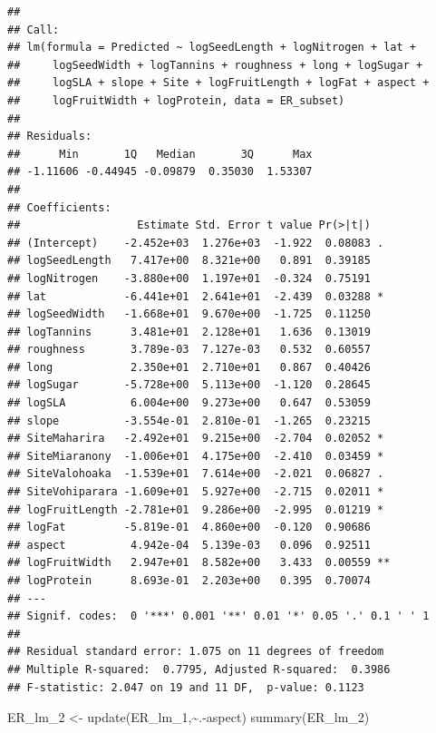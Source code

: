 \documentclass[
  12pt,
]{article}
\newenvironment{Shaded}{\begin{snugshade}}{\end{snugshade}}
\newcommand{\FunctionTok}[1]{\textcolor[rgb]{0.00,0.00,0.00}{#1}}
\newcommand{\NormalTok}[1]{#1}
\newcommand{\OtherTok}[1]{\textcolor[rgb]{0.56,0.35,0.01}{#1}}
\newcommand{\SpecialCharTok}[1]{\textcolor[rgb]{0.00,0.00,0.00}{#1}}
\begin{document}
\begin{verbatim}
## 
## Call:
## lm(formula = Predicted ~ logSeedLength + logNitrogen + lat + 
##     logSeedWidth + logTannins + roughness + long + logSugar + 
##     logSLA + slope + Site + logFruitLength + logFat + aspect + 
##     logFruitWidth + logProtein, data = ER_subset)
## 
## Residuals:
##      Min       1Q   Median       3Q      Max 
## -1.11606 -0.44945 -0.09879  0.35030  1.53307 
## 
## Coefficients:
##                  Estimate Std. Error t value Pr(>|t|)   
## (Intercept)    -2.452e+03  1.276e+03  -1.922  0.08083 . 
## logSeedLength   7.417e+00  8.321e+00   0.891  0.39185   
## logNitrogen    -3.880e+00  1.197e+01  -0.324  0.75191   
## lat            -6.441e+01  2.641e+01  -2.439  0.03288 * 
## logSeedWidth   -1.668e+01  9.670e+00  -1.725  0.11250   
## logTannins      3.481e+01  2.128e+01   1.636  0.13019   
## roughness       3.789e-03  7.127e-03   0.532  0.60557   
## long            2.350e+01  2.710e+01   0.867  0.40426   
## logSugar       -5.728e+00  5.113e+00  -1.120  0.28645   
## logSLA          6.004e+00  9.273e+00   0.647  0.53059   
## slope          -3.554e-01  2.810e-01  -1.265  0.23215   
## SiteMaharira   -2.492e+01  9.215e+00  -2.704  0.02052 * 
## SiteMiaranony  -1.006e+01  4.175e+00  -2.410  0.03459 * 
## SiteValohoaka  -1.539e+01  7.614e+00  -2.021  0.06827 . 
## SiteVohiparara -1.609e+01  5.927e+00  -2.715  0.02011 * 
## logFruitLength -2.781e+01  9.286e+00  -2.995  0.01219 * 
## logFat         -5.819e-01  4.860e+00  -0.120  0.90686   
## aspect          4.942e-04  5.139e-03   0.096  0.92511   
## logFruitWidth   2.947e+01  8.582e+00   3.433  0.00559 **
## logProtein      8.693e-01  2.203e+00   0.395  0.70074   
## ---
## Signif. codes:  0 '***' 0.001 '**' 0.01 '*' 0.05 '.' 0.1 ' ' 1
## 
## Residual standard error: 1.075 on 11 degrees of freedom
## Multiple R-squared:  0.7795, Adjusted R-squared:  0.3986 
## F-statistic: 2.047 on 19 and 11 DF,  p-value: 0.1123
\end{verbatim}

\begin{Shaded}
\begin{Highlighting}[]
\NormalTok{ER\_lm\_2 }\OtherTok{\textless{}{-}} \FunctionTok{update}\NormalTok{(ER\_lm\_1,}\SpecialCharTok{\textasciitilde{}}\NormalTok{.}\SpecialCharTok{{-}}\NormalTok{aspect)}
\FunctionTok{summary}\NormalTok{(ER\_lm\_2)}
\end{Highlighting}
\end{Shaded}
\end{document}
